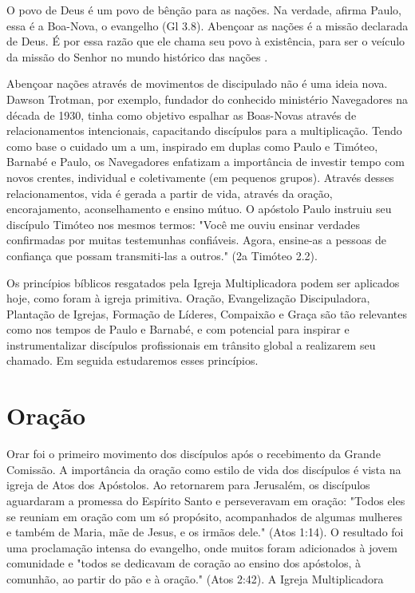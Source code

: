 \documentclass[12pt,openright,oneside,a4paper]{abntex2}
\begin{document}
\begin{citacao}O povo de Deus é um povo de bênção para as nações. Na verdade, afirma Paulo, essa é a Boa-Nova, o evangelho (Gl 3.8). Abençoar as nações é a missão declarada de Deus. É por essa razão que ele chama seu povo à existência, para ser o veículo da missão do Senhor no mundo histórico das nações \cite[p. 98]{wright_missao_2012}.\end{citacao}

Abençoar nações através de movimentos de discipulado não é uma ideia nova. Dawson Trotman, por exemplo, fundador do conhecido ministério Navegadores na década de 1930, tinha como objetivo espalhar as Boas-Novas através de relacionamentos intencionais, capacitando discípulos para a multiplicação. Tendo como base o cuidado um a um, inspirado em duplas como Paulo e Timóteo, Barnabé e Paulo, os Navegadores enfatizam a importância de investir tempo com novos crentes, individual e coletivamente (em pequenos grupos). Através desses relacionamentos, vida é gerada a partir de vida, através da oração, encorajamento, aconselhamento e ensino mútuo\cite[p. 21]{freitas}. O apóstolo Paulo instruiu seu discípulo Timóteo nos mesmos termos: "Você me ouviu ensinar verdades confirmadas por muitas testemunhas confiáveis. Agora, ensine-as a pessoas de confiança que possam transmiti-las a outros." (2a Timóteo 2.2).

Os princípios bíblicos resgatados pela Igreja Multiplicadora podem ser aplicados hoje, como foram à igreja primitiva. Oração, Evangelização Discipuladora, Plantação de Igrejas, Formação de Líderes, Compaixão e Graça são tão relevantes como nos tempos de Paulo e Barnabé, e com potencial para inspirar e instrumentalizar discípulos profissionais em trânsito global a realizarem seu chamado. Em seguida estudaremos esses princípios.


\section{Oração}

Orar foi o primeiro movimento dos discípulos após o recebimento da Grande Comissão\cite[p. 28]{brandao}. A importância da oração como estilo de vida dos discípulos é vista na igreja de Atos dos Apóstolos. Ao retornarem para Jerusalém, os discípulos aguardaram a promessa do Espírito Santo e perseveravam em oração: "Todos eles se reuniam em oração com um só propósito, acompanhados de algumas mulheres e também de Maria, mãe de Jesus, e os irmãos dele." (Atos 1:14). O resultado foi uma proclamação intensa do evangelho, onde muitos foram adicionados à jovem comunidade e "todos se dedicavam de coração ao ensino dos apóstolos, à comunhão, ao partir do pão e à oração." (Atos 2:42). A Igreja Multiplicadora 
\end{document}
